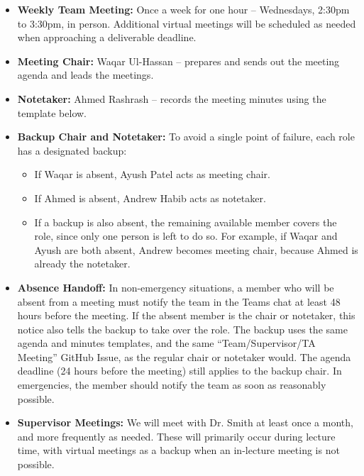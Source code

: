 \documentclass{article}
\begin{document}
\begin{itemize}
    \item \textbf{Weekly Team Meeting:} Once a week for one hour -- Wednesdays, 2:30pm to 3:30pm, in person.
          Additional virtual meetings will be scheduled as needed when approaching a deliverable deadline.

    \item \textbf{Meeting Chair:} Waqar Ul-Hassan -- prepares and sends out
          the meeting agenda and leads the meetings.

    \item \textbf{Notetaker:} Ahmed Rashrash -- records the meeting minutes
          using the template below.

    \item \textbf{Backup Chair and Notetaker:} To avoid a single point of
          failure, each role has a designated backup:
          \begin{itemize}
              \item If Waqar is absent, Ayush Patel acts as meeting chair.
              \item If Ahmed is absent, Andrew Habib acts as notetaker.
              \item If a backup is also absent, the remaining available
                    member covers the role, since only one person is left
                    to do so. For example, if Waqar and Ayush are both
                    absent, Andrew becomes meeting chair, because Ahmed is
                    already the notetaker.
          \end{itemize}

    \item \textbf{Absence Handoff:} In non-emergency situations, a member who
          will be absent from a meeting must notify the team in the Teams
          chat at least 48 hours before the meeting. If the absent member is
          the chair or notetaker, this notice also tells the backup to take
          over the role. The backup uses the same agenda and minutes
          templates, and the same ``Team/Supervisor/TA Meeting'' GitHub Issue, as the
          regular chair or notetaker would. The agenda deadline (24 hours
          before the meeting) still applies to the backup chair. In
          emergencies, the member should notify the team as soon as
          reasonably possible.

    \item \textbf{Supervisor Meetings:} We will meet with Dr. Smith at least once a month, and more frequently as needed. These will primarily occur during lecture time, with virtual meetings as a backup when an in-lecture meeting is not possible.


\end{itemize}
\end{document}
